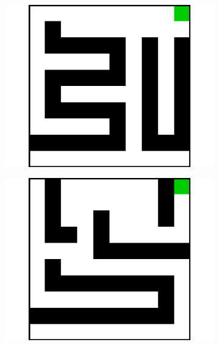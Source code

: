 \documentclass{article}
\begin{document}
\begin{figure}[t]
\centering
\begin{subfigure}[t]{0.18\textwidth}
    \includegraphics[width=\textwidth]{images/maze/maze0.pdf}
    \caption{}
  \end{subfigure}
  \begin{subfigure}[t]{0.18\textwidth}
    \includegraphics[width=\textwidth]{images/maze/maze1.pdf}
    \caption{}
  \end{subfigure}
  \begin{subfigure}[t]{0.18\textwidth}

\end{subfigure}
\end{figure}
\end{document}
